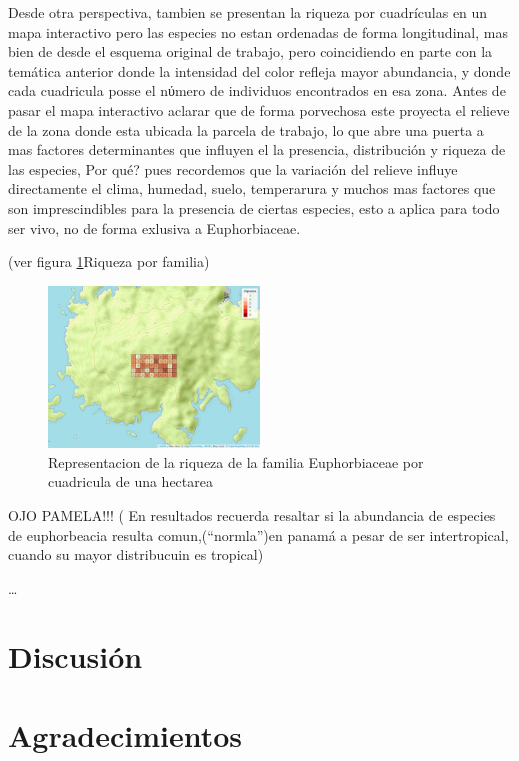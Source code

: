 \documentclass[11pt,]{article}
\begin{document}
Desde otra perspectiva, tambien se presentan la riqueza por cuadrículas
en un mapa interactivo pero las especies no estan ordenadas de forma
longitudinal, mas bien de desde el esquema original de trabajo, pero
coincidiendo en parte con la temática anterior donde la intensidad del
color refleja mayor abundancia, y donde cada cuadricula posse el nύmero
de individuos encontrados en esa zona. Antes de pasar el mapa
interactivo aclarar que de forma porvechosa este proyecta el relieve de
la zona donde esta ubicada la parcela de trabajo, lo que abre una puerta
a mas factores determinantes que influyen el la presencia, distribución
y riqueza de las especies, Por qué? pues recordemos que la variación del
relieve influye directamente el clima, humedad, suelo, temperarura y
muchos mas factores que son imprescindibles para la presencia de ciertas
especies, esto a aplica para todo ser vivo, no de forma exlusiva a
Euphorbiaceae.

(ver figura \ref{fig:cuadro_de_riqueza_familia}Riqueza por familia)

\begin{figure}
\centering
\includegraphics[width=0.50000\textwidth]{mapa_cuadros_riq_mi_familia.png}
\caption{\label{fig:cuadro_de_riqueza_familia}Representacion de la
riqueza de la familia Euphorbiaceae por cuadricula de una hectarea}
\end{figure}

OJO PAMELA!!! ( En resultados recuerda resaltar si la abundancia de
especies de euphorbeacia resulta comun,(``normla'')en panamá a pesar de
ser intertropical, cuando su mayor distribucuin es tropical)

\ldots

\section{Discusión}\label{discusiuxf3n}

\section{Agradecimientos}\label{agradecimientos}
\end{document}
